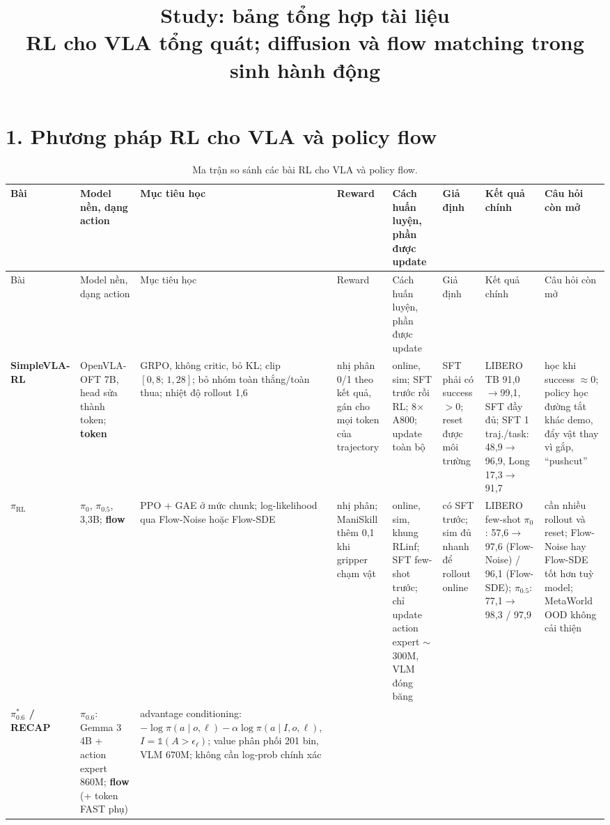 \documentclass[9pt,a4paper]{extarticle}
\title{\textbf{Study: bảng tổng hợp tài liệu}\\[2pt]\large RL cho VLA tổng quát; diffusion và flow matching trong sinh hành động}
\date{}
\begin{document}
\maketitle
\vspace{-2.5em}


\section*{1. Phương pháp RL cho VLA và policy flow}
{\scriptsize
\begin{longtable}{@{}L{2.0cm} L{2.6cm} L{3.6cm} L{2.7cm} L{3.0cm} L{3.0cm} L{3.3cm} L{3.4cm}@{}}
\caption{Ma trận so sánh các bài RL cho VLA và policy flow.}\label{tab:rl}\\
\toprule
Bài & Model nền, dạng action & Mục tiêu học & Reward & Cách huấn luyện, phần được update & Giả định & Kết quả chính & Câu hỏi còn mở \\
\midrule\endfirsthead
\toprule
Bài & Model nền, dạng action & Mục tiêu học & Reward & Cách huấn luyện, phần được update & Giả định & Kết quả chính & Câu hỏi còn mở \\
\midrule\endhead
\bottomrule\endfoot
\textbf{SimpleVLA-RL} 
& OpenVLA-OFT 7B, head sửa thành token; \textbf{token}
& GRPO, không critic, bỏ KL; clip $[0{,}8;\,1{,}28]$; bỏ nhóm toàn thắng/toàn thua; nhiệt độ rollout 1,6
& nhị phân 0/1 theo kết quả, gán cho mọi token của trajectory 
& online, sim; SFT trước rồi RL; 8$\times$A800; update toàn bộ
& SFT phải có success $>0$; reset được môi trường
& LIBERO TB 91,0$\to$99,1, SFT đầy đủ; SFT 1 traj./task: 48,9$\to$96,9, Long 17,3$\to$91,7 
& học khi success $\approx0$; policy học đường tắt khác demo, đẩy vật thay vì gắp, ``pushcut''\\
\midrule
\textbf{$\pi_{\text{RL}}$}
& $\pi_0$, $\pi_{0.5}$, 3,3B; \textbf{flow}
& PPO + GAE ở mức chunk; log-likelihood qua Flow-Noise hoặc Flow-SDE
& nhị phân; ManiSkill thêm 0,1 khi gripper chạm vật
& online, sim, khung RLinf; SFT few-shot trước; chỉ update action expert $\sim$300M, VLM đóng băng
& có SFT trước; sim đủ nhanh để rollout online
& LIBERO few-shot $\pi_0$: 57,6$\to$97,6 (Flow-Noise) / 96,1 (Flow-SDE); $\pi_{0.5}$: 77,1$\to$98,3 / 97,9
& cần nhiều rollout và reset; Flow-Noise hay Flow-SDE tốt hơn tuỳ model; MetaWorld OOD không cải thiện \\
\midrule
\textbf{$\pi^*_{0.6}$ / RECAP} 
& $\pi_{0.6}$: Gemma 3 4B + action expert 860M; \textbf{flow} (+ token FAST phụ)
& advantage conditioning: $-\log\pi(a\mid o,\ell)-\alpha\log\pi(a\mid I,o,\ell)$, $I=\mathbb{1}(A>\epsilon_\ell)$; value phân phối 201 bin, VLM 670M; không cần log-prob chính xác

\end{longtable}}
\end{document}
